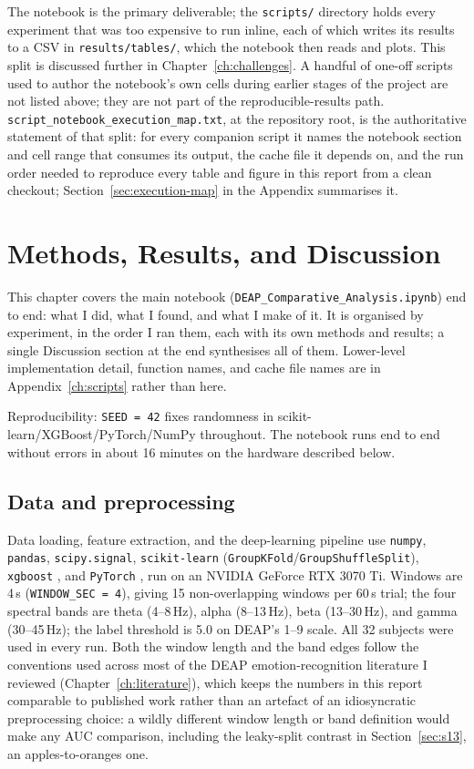 \documentclass[11pt]{report}
\begin{document}
The notebook is the primary deliverable; the \texttt{scripts/} directory holds
every experiment that was too expensive to run inline, each of which writes
its results to a CSV in \texttt{results/tables/}, which the notebook then
reads and plots. This split is discussed further in Chapter~\ref{ch:challenges}.
A handful of one-off scripts used to author the notebook's own cells during
earlier stages of the project are not listed above; they are not part of the
reproducible-results path. \texttt{script\_notebook\_execution\_map.txt}, at
the repository root, is the authoritative statement of that split: for every
companion script it names the notebook section and cell range that consumes
its output, the cache file it depends on, and the run order needed to
reproduce every table and figure in this report from a clean checkout;
Section~\ref{sec:execution-map} in the Appendix summarises it.

\chapter{Methods, Results, and Discussion}
\label{ch:notebook}

This chapter covers the main notebook (\texttt{DEAP\_Comparative\_Analysis.ipynb})
end to end: what I did, what I found, and what I make of it. It is organised
by experiment, in the order I ran them, each with its own methods and
results; a single Discussion section at the end synthesises all of them.
Lower-level implementation detail, function names, and cache file names are
in Appendix~\ref{ch:scripts} rather than here.

Reproducibility: \texttt{SEED = 42} fixes randomness in
scikit-learn/XGBoost/PyTorch/NumPy throughout. The notebook runs end to end
without errors in about 16 minutes on the hardware described below.

\section{Data and preprocessing}
\label{sec:s1}
Data loading, feature extraction, and the deep-learning pipeline use
\texttt{numpy}, \texttt{pandas}, \texttt{scipy.signal}, \texttt{scikit-learn}
\citep{pedregosa2011sklearn}
(\texttt{GroupKFold}/\texttt{GroupShuffleSplit}), \texttt{xgboost}
\citep{chen2016xgboost}, and \texttt{PyTorch} \citep{paszke2019pytorch}, run
on an NVIDIA GeForce RTX 3070 Ti. Windows are 4\,s
(\texttt{WINDOW\_SEC = 4}), giving 15 non-overlapping windows per 60\,s
trial; the four spectral bands are theta (4--8\,Hz), alpha (8--13\,Hz), beta
(13--30\,Hz), and gamma (30--45\,Hz); the label threshold is 5.0 on DEAP's
1--9 scale. All 32 subjects were used in every run. Both the window length
and the band edges follow the conventions used across most of the DEAP
emotion-recognition literature I reviewed (Chapter~\ref{ch:literature}),
which keeps the numbers in this report comparable to published work rather
than an artefact of an idiosyncratic preprocessing choice: a wildly
different window length or band definition would make any AUC comparison,
including the leaky-split contrast in Section~\ref{sec:s13}, an
apples-to-oranges one.
\end{document}
